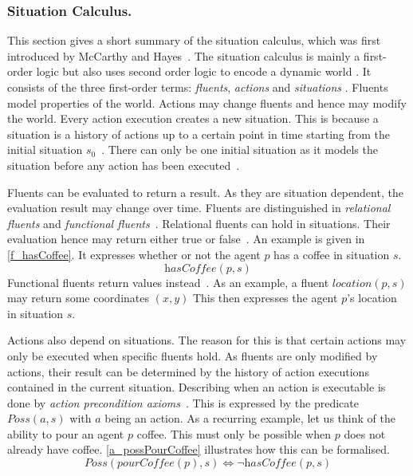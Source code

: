 \subsubsection{Situation Calculus.}\label{fun:apl_sitCalc}
This section gives a short summary of the situation calculus, which was first introduced by McCarthy and Hayes~\cite{mccarthy_philosophical_1969}. The situation calculus is mainly a first-order logic but also uses second order logic to encode a dynamic world \cite{levesque_golog:_1997}. %
It consists of the three first-order terms: \emph{fluents}, \emph{actions} and \emph{situations} \cite{mccarthy_philosophical_1969,boutilier_decision_2000}. %
Fluents model properties of the world. Actions may change fluents and hence may modify the world. Every action execution creates a new situation. This is because a situation is a history of actions up to a certain point in time starting from the initial situation $s_0$~\cite{schiffel_reconciling_2006,levesque_golog:_1997}. %
There can only be one initial situation as it models the situation before any action has been executed~\cite{pirri_contributions_1999}. %

Fluents can be evaluated to return a result. As they are situation dependent, the evaluation result may change over time. Fluents are distinguished in \emph{relational fluents} and \emph{functional fluents}~\cite{levesque_golog:_1997}. %
Relational fluents can hold in situations. Their evaluation hence may return either true or false~\cite{boutilier_decision_2000}. %
An example is given in \autoref{f_hasCoffee}. It expresses whether or not the agent $p$ has a coffee in situation $s$.
\begin{equation}\label{f_hasCoffee}
  \textit{hasCoffee}(p,s)
\end{equation}
Functional fluents return values instead~\cite{levesque_golog:_1997}. %
As an example, a fluent $\textit{location}(p,s)$ may return some coordinates $(x,y)$ This then expresses the agent $p$'s location in situation $s$.

Actions also depend on situations. The reason for this is that certain actions may only be executed when specific fluents hold. As fluents are only modified by actions, their result can be determined by the history of action executions contained in the current situation. Describing when an action is executable is done by \emph{action precondition axioms}~\cite{lin_state_1994}. %
This is expressed by the predicate $\textit{Poss}(a,s)$ with $a$ being an action. As a recurring example, let us think of the ability to pour an agent $p$ coffee. This must only be possible when $p$ does not already have coffee. \autoref{a_possPourCoffee} illustrates how this can be formalised.
\begin{equation}\label{a_possPourCoffee}
  \textit{Poss}(\textit{pourCoffee}(p),s) \Leftrightarrow \neg \textit{hasCoffee}(p,s)
\end{equation}

